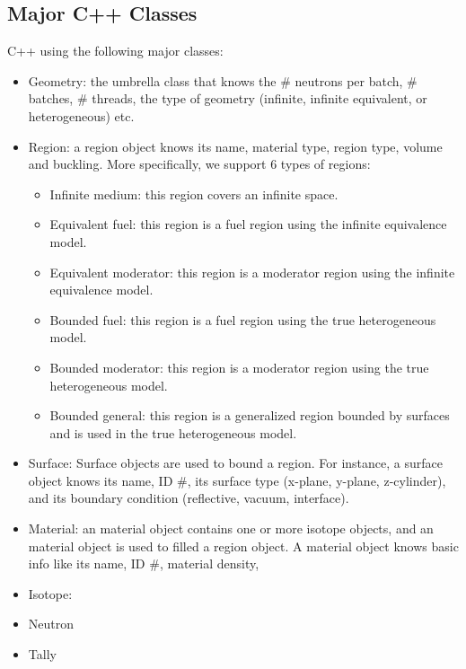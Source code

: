 \documentclass[titlepage]{article}
\begin{document}
\clearpage
\subsection{Major C++ Classes}
C++ using the following major classes: 
\begin{itemize}
\item Geometry: the umbrella class that knows the \# neutrons per batch, \# batches, \# threads, the type of geometry (infinite, infinite equivalent, or heterogeneous) etc. 
\item Region: a region object knows its name, material type, region type, volume and buckling. More specifically, we support 6 types of regions: 
  \begin{itemize}
    \item Infinite medium: this region covers an infinite space. 
    \item Equivalent fuel: this region is a fuel region using the infinite equivalence model. 
    \item Equivalent moderator: this region is a moderator region using the infinite equivalence model. 
    \item Bounded fuel: this region is a fuel region using the true heterogeneous model. 
    \item Bounded moderator: this region is a moderator region using the true heterogeneous model. 
    \item Bounded general: this region is a generalized region bounded by surfaces and is used in the true heterogeneous model. 
  \end{itemize}

\item Surface: Surface objects are used to bound a region. For instance, a surface object knows its name, ID \#, its surface type (x-plane, y-plane, z-cylinder), and its boundary condition (reflective, vacuum, interface). 

\item Material: an material object contains one or more isotope objects, and an material object is used to filled a region object. A material object knows basic info like its name, ID \#, material density, 


\item Isotope:

\item Neutron

\item Tally
\end{itemize}
\end{document}
